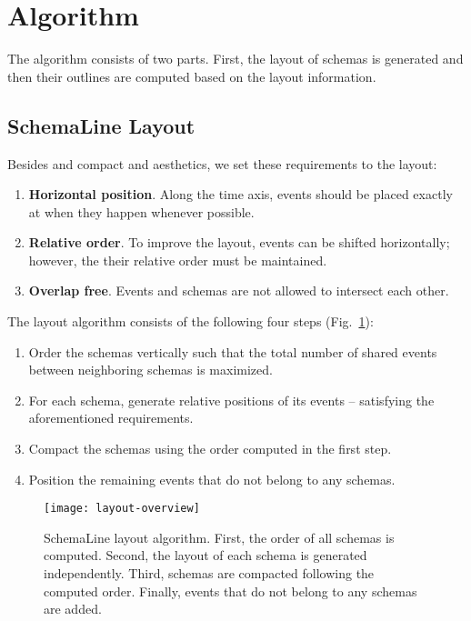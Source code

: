 \section{Algorithm}
\label{sec:layout}

The algorithm consists of two parts. First, the layout of schemas is generated and then their outlines are computed based on the layout information.

\subsection{SchemaLine Layout}
\label{sub:schema-layout}
Besides and compact and aesthetics, we set these requirements to the layout: 
\begin{enumerate}
	\item \textbf{Horizontal position}. Along the time axis, events should be placed exactly at when they happen whenever possible.
	\item \textbf{Relative order}. To improve the layout, events can be shifted horizontally; however, the their relative order must be maintained. 
	\item \textbf{Overlap free}. Events and schemas are not allowed to intersect each other.
\end{enumerate}

The layout algorithm consists of the following four steps (Fig.~\ref{fig:layout-overview}):
\begin{enumerate} 
	\item Order the schemas vertically such that the total number of shared events between neighboring schemas is maximized.
	\item For each schema, generate relative positions of its events -- satisfying the aforementioned requirements.
	\item Compact the schemas using the order computed in the first step.
	\item Position the remaining events that do not belong to any schemas. 
\end{enumerate}

\begin{figure}[ht]
\centering
\texttt{[image: layout-overview]}
\caption{SchemaLine layout algorithm. First, the order of all schemas is computed. Second, the layout of each schema is generated independently. Third, schemas are compacted following the computed order. Finally, events that do not belong to any schemas are added.}
\label{fig:layout-overview}
\end{figure}

